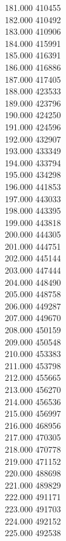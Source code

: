 { 181.000	410455 \\
 182.000	410492 \\
 183.000	410906 \\
 184.000	415991 \\
 185.000	416391 \\
 186.000	416886 \\
 187.000	417405 \\
 188.000	423533 \\
 189.000	423796 \\
 190.000	424250 \\
 191.000	424596 \\
 192.000	432907 \\
 193.000	433349 \\
 194.000	433794 \\
 195.000	434298 \\
 196.000	441853 \\
 197.000	443033 \\
 198.000	443395 \\
 199.000	443818 \\
 200.000	444305 \\
 201.000	444751 \\
 202.000	445144 \\
 203.000	447444 \\
 204.000	448490 \\
 205.000	448758 \\
 206.000	449287 \\
 207.000	449670 \\
 208.000	450159 \\
 209.000	450548 \\
 210.000	453383 \\
 211.000	453798 \\
 212.000	455665 \\
 213.000	456270 \\
 214.000	456536 \\
 215.000	456997 \\
 216.000	468956 \\
 217.000	470305 \\
 218.000	470778 \\
 219.000	471152 \\
 220.000	488698 \\
 221.000	489829 \\
 222.000	491171 \\
 223.000	491703 \\
 224.000	492152 \\
 225.000	492538 \\
}
